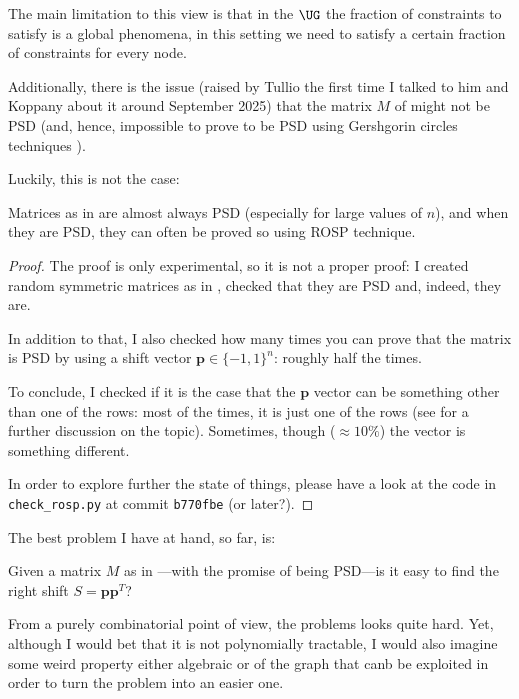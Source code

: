The main limitation to this view is that in the $\UG$ the fraction of constraints to satisfy is a global phenomena, in this setting we need to satisfy a certain fraction of constraints for every node.

Additionally, there is the issue (raised by Tullio the first time I talked to him and Koppany about it around September 2025) that the matrix $M$ of  might not be PSD (and, hence, impossible to prove to be PSD using Gershgorin circles techniques \cite{deville_optimizing_2019,varga_gersgorin_2004}).

Luckily, this is not the case:

\begin{proposition}
\label{prop:combinatorial_M_is_psd}
	Matrices as in  are almost always PSD (especially for large values of $n$), and when they are PSD, they can often be proved so using ROSP technique.
\end{proposition}

\begin{proof}
	The proof is only experimental, so it is not a proper proof: I created random symmetric matrices as in , checked that they are PSD and, indeed, they are.
	
	In addition to that, I also checked how many times you can prove that the matrix is PSD by using a shift vector $\mathbf{p}\in\{-1,1\}^n$: roughly half the times.
	
	To conclude, I checked if it is the case that the $\mathbf{p}$ vector can be something other than one of the rows: most of the times, it is just one of the rows (see  for a further discussion on the topic). Sometimes, though ($\approx 10\%$) the vector is something different.
	
	In order to explore further the state of things, please have a look at the code in \texttt{check\_rosp.py} at commit \texttt{b770fbe} (or later?).
\end{proof}

The best problem I have at hand, so far, is:

\begin{question}
	Given a matrix $M$ as in ---with the promise of being PSD---is it easy to find the right shift $S=\mathbf{pp}^T$? 
\end{question}

From a purely combinatorial point of view, the problems looks quite hard. Yet, although I would bet that it is not polynomially tractable, I would also imagine some weird property either algebraic or of the graph that canb be exploited in order to turn the problem into an easier one.

